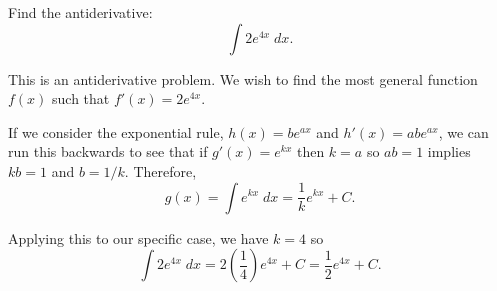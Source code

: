 \documentclass{ximera}
\author{Emma Smith Zbarsky}
\begin{document}
\begin{exercise}

Find the antiderivative: \[\int 2e^{4x}\; dx.\]


\begin{hint}
This is an antiderivative problem. We wish to find the most general
function $f(x)$ such that $f'(x) = 2e^{4x}$.
\end{hint}


\begin{hint}
If we consider the exponential rule, $h(x) = be^{ax}$ and
$h'(x) = abe^{ax}$, we can run this backwards to see that if
$g'(x) = e^{kx}$ then $k=a$ so $ab = 1$ implies $kb = 1$ and $b = 1/k$.
Therefore, \[g(x) = \int e^{kx}\; dx = \frac{1}{k}e^{kx}+C.\]

Applying this to our specific case, we have $k=4$ so
\[\int 2e^{4x}\; dx = 2\left(\frac{1}{4}\right)e^{4x}+C = \frac{1}{2}e^{4x}+C.\]
\end{hint}


\begin{multipleChoice}
\end{multipleChoice}

\end{exercise}
\end{document}

